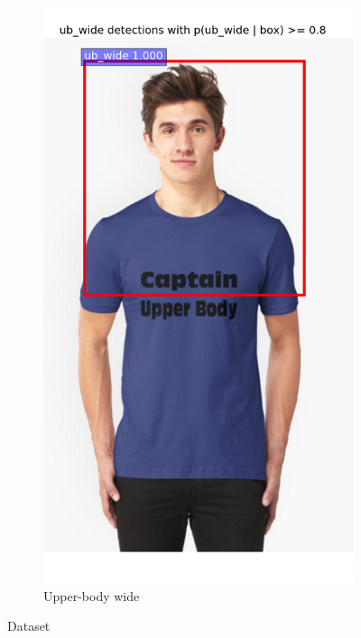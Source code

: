 \documentclass[conference]{IEEEtran}
\begin{document}
\begin{figure}
\begin{subfigure}[b]{0.2\textwidth}
		\label{fig:ubs}
	\end{subfigure}
	~ %
	\begin{subfigure}[b]{0.2\textwidth}
		\includegraphics[width=\textwidth]{ub_wide}
		\caption{Upper-body wide}
		\label{fig:ubw}
	\end{subfigure}
	\caption{Dataset}\label{fig:dataset}
\end{figure}

\end{document}
